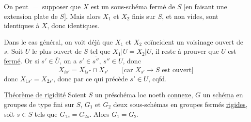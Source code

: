 On peut $=$ supposer que $X$ est un sous-schéma fermé de $S$ [en faisant une extension   plate de $S$]. Mais alors $X_1$ et $X_2$  finis  sur $S$, et non vides, sont identiques à $X$, donc identiques. 

Dans le cas général, on voit déjà que $X_1$ et $X_2$ coïncident  un voisinage ouvert  de $s$. Soit $U$ le plus  ouvert de $S$ tel que $X_1|U=X_2|U$, il reste à prouver que $U$ est \uline{fermé}. Or si $s'\in\overline U$, on a $s'\in\overline{s''}$, $s''\in U$, donc
\[
X_{is'}=\overline{X_{is''}}\cap X_{s'}\qquad
\text{[car $X_{s'}\to S$ est ouvert]}
\]
donc $X_{1s'}=X_{2s'}$, donc par ce qui précède $s'\in U$, cqfd.

\uline{Théorème de rigidité} Soient $S$ un préschéma loc noeth \uline{connexe}, $G$ un \uline{schéma} en groupes  de type fini  sur $S$, $G_1$ et $G_2$ deux sous-schémas en groupes fermés \uline{rigides}, soit $s\in S$ tels que $G_{1s}=G_{2s}$.   Alors $G_1=G_2$.
